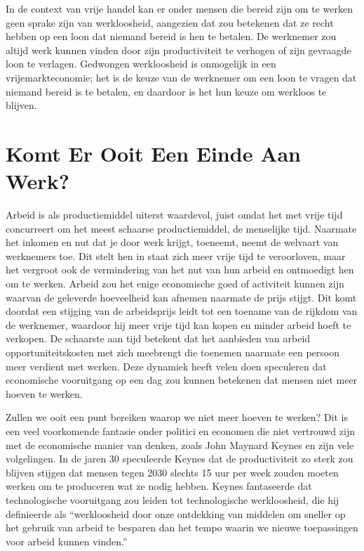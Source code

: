 In de context van vrije handel kan er onder mensen die bereid zijn om te
werken geen sprake zijn van werkloosheid, aangezien dat zou betekenen
dat ze recht hebben op een loon dat niemand bereid is hen te betalen. De
werknemer zou altijd werk kunnen vinden door zijn productiviteit te
verhogen of zijn gevraagde loon te verlagen. Gedwongen werkloosheid is
onmogelijk in een vrijemarkteconomie; het is de keuze van de werknemer
om een loon te vragen dat niemand bereid is te betalen, en daardoor is
het hun keuze om werkloos te blijven.

\section{Komt Er Ooit Een Einde Aan Werk?}

Arbeid is als productiemiddel uiterst waardevol, juist omdat het met
vrije tijd concurreert om het meest schaarse productiemiddel, de
menselijke tijd. Naarmate het inkomen en nut dat je door werk krijgt,
toeneemt, neemt de welvaart van werknemers toe. Dit stelt hen in staat
zich meer vrije tijd te veroorloven, maar het vergroot ook de
vermindering van het nut van hun arbeid en ontmoedigt hen om te werken.
Arbeid zou het enige economische goed of activiteit kunnen zijn waarvan
de geleverde hoeveelheid kan afnemen naarmate de prijs stijgt. Dit komt
doordat een stijging van de arbeidsprijs leidt tot een toename van de
rijkdom van de werknemer, waardoor hij meer vrije tijd kan kopen en
minder arbeid hoeft te verkopen. De schaarste aan tijd betekent dat het
aanbieden van arbeid opportuniteitskosten met zich meebrengt die
toenemen naarmate een persoon meer verdient met werken. Deze dynamiek
heeft velen doen speculeren dat economische vooruitgang op een dag zou
kunnen betekenen dat mensen niet meer hoeven te werken.

Zullen we ooit een punt bereiken waarop we niet meer hoeven te werken?
Dit is een veel voorkomende fantasie onder politici en economen die niet
vertrouwd zijn met de economische manier van denken, zoals John Maynard
Keynes en zijn vele volgelingen. In de jaren 30 speculeerde Keynes dat
de productiviteit zo sterk zou blijven stijgen dat mensen tegen 2030
slechts 15 uur per week zouden moeten werken om te produceren wat ze
nodig hebben. Keynes fantaseerde dat technologische vooruitgang zou
leiden tot technologische werkloosheid, die hij definieerde als
\enquote{werkloosheid door onze ontdekking van middelen om sneller op het
gebruik van arbeid te besparen dan het tempo waarin we nieuwe
toepassingen voor arbeid kunnen vinden.}\autocite{43}

